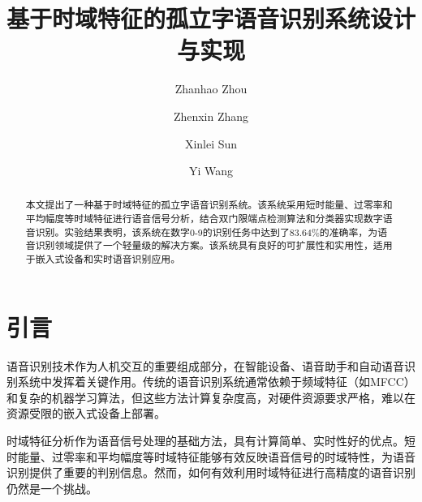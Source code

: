 \documentclass[sigconf,nonacm]{acmart}
\begin{document}
\title[基于时域特征的孤立字语音识别系统设计与实现]{基于时域特征的孤立字语音识别系统设计与实现}

\pagestyle{plain}\makeatletter
\def\ps@acmheadings{%
  \def\@oddhead{}%
  \def\@evenhead{}%
  \def\@oddfoot{}%
  \def\@evenfoot{}%
}
\makeatother

\author{Zhanhao Zhou}

\author{Zhenxin Zhang}

\author{Xinlei Sun}

\author{Yi Wang}

\begin{abstract}
本文提出了一种基于时域特征的孤立字语音识别系统。该系统采用短时能量、过零率和平均幅度等时域特征进行语音信号分析，结合双门限端点检测算法和分类器实现数字语音识别。实验结果表明，该系统在数字0-9的识别任务中达到了83.64\%的准确率，为语音识别领域提供了一个轻量级的解决方案。该系统具有良好的可扩展性和实用性，适用于嵌入式设备和实时语音识别应用。
\end{abstract}

\maketitle

\section{引言}

语音识别技术作为人机交互的重要组成部分，在智能设备、语音助手和自动语音识别系统中发挥着关键作用。传统的语音识别系统通常依赖于频域特征（如MFCC）和复杂的机器学习算法，但这些方法计算复杂度高，对硬件资源要求严格，难以在资源受限的嵌入式设备上部署。

时域特征分析作为语音信号处理的基础方法，具有计算简单、实时性好的优点。短时能量、过零率和平均幅度等时域特征能够有效反映语音信号的时域特性，为语音识别提供了重要的判别信息。然而，如何有效利用时域特征进行高精度的语音识别仍然是一个挑战。
\end{document}
